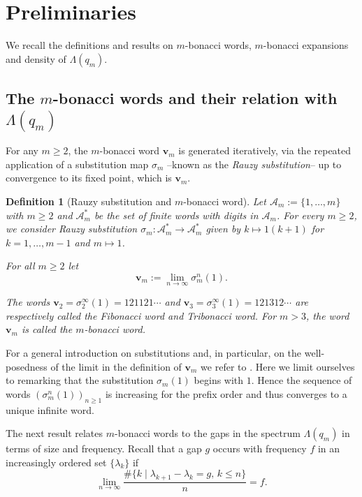 \documentclass{amsart}
\newtheorem{definition}[theorem]{Definition}
\begin{document}
\section{Preliminaries}\label{sec2}
We recall the definitions and results on $m$-bonacci words, $m$-bonacci expansions and density of $\Lambda(q_m)$.

\subsection{The $m$-bonacci words and their relation with $\Lambda(q_m)$}
For any $m\geq 2$, the $m$-bonacci word $\mathbf v_m$ is generated iteratively, via the repeated application of a substitution map $\sigma_m$ --known as the \emph{Rauzy substitution}-- up to convergence to its fixed point, which is $\mathbf v_m$. 

\begin{definition}[Rauzy substitution and $m$-bonacci word]   Let $\mathcal A_m:=\{1,\dots,m\}$ with $m\geq 2$ and $\mathcal A_m^*$ be the set of finite words with digits in $\mathcal A_m$. For every $m\geq 2$, we consider \emph{Rauzy substitution} $\sigma_m:\mathcal A_m^*\to \mathcal A_m^*$ given by
$k\mapsto 1(k+1)$ for $k=1,\dots,m-1$ and $m\mapsto 1$. 


For all $m\geq 2$ let
    $$\mathbf v_m:=\lim_{n\to \infty}\sigma^n_m(1).$$ 
    
   The words $\mathbf v_2=\sigma_2^\infty(1)=121121\cdots$  and $\mathbf v_3=\sigma_3^\infty(1)=121312\cdots$ are respectively called the \emph{Fibonacci word} and \emph{Tribonacci word}. For $m> 3$, the word $\mathbf v_m$ is called the \emph{$m$-bonacci word}. 
\end{definition}
For a general introduction on substitutions and, in particular, on the well-posedness of the limit in the definition of $\mathbf v_m$ we refer to \cite{Loth}. Here we limit ourselves to remarking that the substitution $\sigma_m(1)$ begins with $1$. 
Hence the sequence of words $(\sigma_m^n(1))_{n\geq 1}$ is increasing
for the prefix order and thus converges to a unique infinite word.

\medskip
The next result relates $m$-bonacci words to the gaps in the spectrum $\Lambda(q_m)$ in terms of size and frequency. Recall that a gap $g$ occurs with frequency $f$ in an increasingly ordered set $\{\lambda_k\}$ if 
$$\lim_{n\to \infty}\frac{\#\{k\mid \lambda_{k+1}-\lambda_{k}=g, \, k\leq n\}}{n}=f.$$
\end{document}
